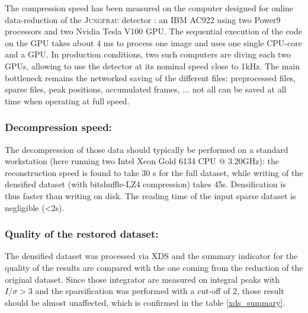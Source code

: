 \documentclass[preprint]{iucr}              %
\begin{document}

The compression speed has been measured on the computer designed for online data-reduction of the \textsc{Jungfrau} detector \cite{sri2021}: 
an IBM AC922 using two Power9 processors and two Nvidia Tesla V100 GPU. 
The sequential execution of the code on the GPU takes about 4 ms to process one image and uses one single CPU-core and a GPU. 
In production conditions, two such computers are diving each two GPUs, allowing to use the detector  at its nominal speed close to 1kHz.
The main bottleneck remains the networked saving of the different files: preprocessed files, sparse files, peak positions, accumulated frames, ... not all can be saved at all time when operating at full speed.

\subsubsection{Decompression speed:} 
The decompression of those data should typically be performed on a standard workstation (here running two Intel Xeon Gold 6134 CPU @ 3.20GHz): the reconstruction speed is found to take 30 s for the full dataset, while writing of the densified dataset (with bitshuffle-LZ4 compression) takes 45s. 
Densification is thus faster than writing on disk.
The reading time of the input sparse dataset is negligible (<2s).

\subsubsection{Quality of the restored dataset:} 
The densified dataset was processed via XDS and the summary indicator for the quality of the results are compared with the one coming from the reduction of the original dataset. 
Since those integrator are measured on integral peaks with $I/\sigma>3$ and the sparsification was performed
with a cut-off of 2, those result should be almost unaffected, which is confirmed in the table \ref{xds_summary}.
\end{document}

